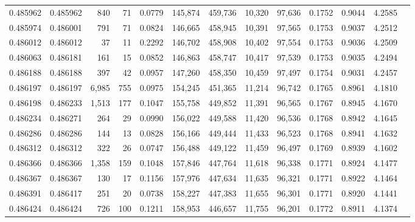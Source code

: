 \begin{tabular}{rrrrrrrrrrrrr}
0.485962 & 0.485962 &   840 &    71 &                                     0.0779 & 145,874 & 459,736 &  10,320 &  97,636 & 0.1752 & 0.9044 & 4.2585 \\
0.485974 & 0.486001 &   791 &    71 &                                     0.0824 & 146,665 & 458,945 &  10,391 &  97,565 & 0.1753 & 0.9037 & 4.2512 \\
0.486012 & 0.486012 &    37 &    11 &                                     0.2292 & 146,702 & 458,908 &  10,402 &  97,554 & 0.1753 & 0.9036 & 4.2509 \\
0.486063 & 0.486181 &   161 &    15 &                                     0.0852 & 146,863 & 458,747 &  10,417 &  97,539 & 0.1753 & 0.9035 & 4.2494 \\
0.486188 & 0.486188 &   397 &    42 &                                     0.0957 & 147,260 & 458,350 &  10,459 &  97,497 & 0.1754 & 0.9031 & 4.2457 \\
0.486197 & 0.486197 & 6,985 &   755 &                                     0.0975 & 154,245 & 451,365 &  11,214 &  96,742 & 0.1765 & 0.8961 & 4.1810 \\
0.486198 & 0.486233 & 1,513 &   177 &                                     0.1047 & 155,758 & 449,852 &  11,391 &  96,565 & 0.1767 & 0.8945 & 4.1670 \\
0.486234 & 0.486271 &   264 &    29 &                                     0.0990 & 156,022 & 449,588 &  11,420 &  96,536 & 0.1768 & 0.8942 & 4.1645 \\
0.486286 & 0.486286 &   144 &    13 &                                     0.0828 & 156,166 & 449,444 &  11,433 &  96,523 & 0.1768 & 0.8941 & 4.1632 \\
0.486312 & 0.486312 &   322 &    26 &                                     0.0747 & 156,488 & 449,122 &  11,459 &  96,497 & 0.1769 & 0.8939 & 4.1602 \\
0.486366 & 0.486366 & 1,358 &   159 &                                     0.1048 & 157,846 & 447,764 &  11,618 &  96,338 & 0.1771 & 0.8924 & 4.1477 \\
0.486367 & 0.486367 &   130 &    17 &                                     0.1156 & 157,976 & 447,634 &  11,635 &  96,321 & 0.1771 & 0.8922 & 4.1464 \\
0.486391 & 0.486417 &   251 &    20 &                                     0.0738 & 158,227 & 447,383 &  11,655 &  96,301 & 0.1771 & 0.8920 & 4.1441 \\
0.486424 & 0.486424 &   726 &   100 &                                     0.1211 & 158,953 & 446,657 &  11,755 &  96,201 & 0.1772 & 0.8911 & 4.1374 \\

\end{tabular}

